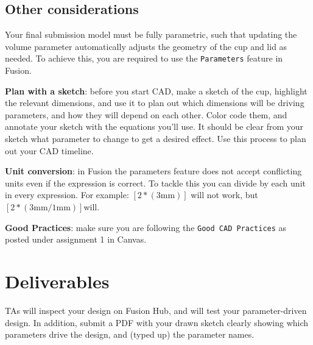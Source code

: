 \documentclass[11pt]{article}
\begin{document}
\subsection*{Other considerations}
Your final submission model must be fully parametric, such that updating the volume parameter automatically adjusts the geometry of the cup and lid as needed.
To achieve this, you are required to use the \texttt{Parameters} feature in Fusion.
\par
\textbf{Plan with a sketch}: before you start CAD, make a sketch of the cup, highlight the relevant dimensions, and use it to plan out which dimensions will be driving parameters, and how they will depend on each other.
Color code them, and annotate your sketch with the equations you'll use.
It should be clear from your sketch what parameter to change to get a desired effect.
Use this process to plan out your CAD timeline.
\par
\textbf{Unit conversion}: in Fusion the parameters feature does not accept conflicting units even if the expression is correct.
To tackle this you can divide by each unit in every expression. For example: $[ 2 * (3 \text{mm}) ]$ will not work, but $[ 2 * (3 \text{mm} / 1 \text{mm}) ]$will.
\par
\textbf{Good Practices}: make sure you are following the \texttt{Good CAD Practices} as posted under assignment 1 in Canvas.
\section{Deliverables}
TAs will inspect your design on Fusion Hub, and will test your parameter-driven design. In addition, submit a PDF with your drawn sketch clearly showing which parameters drive the design, and (typed up) the parameter names.

\end{document}
